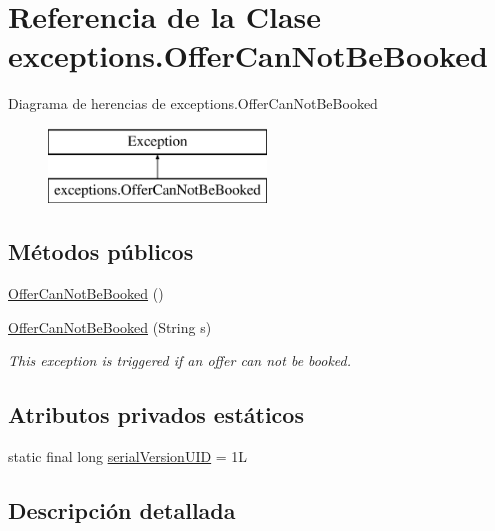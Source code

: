 \hypertarget{classexceptions_1_1_offer_can_not_be_booked}{}\section{Referencia de la Clase exceptions.\+Offer\+Can\+Not\+Be\+Booked}
\label{classexceptions_1_1_offer_can_not_be_booked}
Diagrama de herencias de exceptions.\+Offer\+Can\+Not\+Be\+Booked\begin{figure}[H]
\begin{center}
\leavevmode
\includegraphics[height=2.000000cm]{classexceptions_1_1_offer_can_not_be_booked}
\end{center}
\end{figure}
\subsection*{Métodos públicos}
\begin{DoxyCompactItemize}
\item 
\mbox{\hyperlink{classexceptions_1_1_offer_can_not_be_booked_a113511bf6eedf993448d483ff55cabb0}{Offer\+Can\+Not\+Be\+Booked}} ()
\item 
\mbox{\hyperlink{classexceptions_1_1_offer_can_not_be_booked_a08f25182868a230f2b49b37483560486}{Offer\+Can\+Not\+Be\+Booked}} (String s)
\begin{DoxyCompactList}\small\item\em This exception is triggered if an offer can not be booked. \end{DoxyCompactList}\end{DoxyCompactItemize}
\subsection*{Atributos privados estáticos}
\begin{DoxyCompactItemize}
\item 
static final long \mbox{\hyperlink{classexceptions_1_1_offer_can_not_be_booked_a0f0deac6a5fe9077f31bd1c90f1b0b59}{serial\+Version\+U\+ID}} = 1L
\end{DoxyCompactItemize}


\subsection{Descripción detallada}


